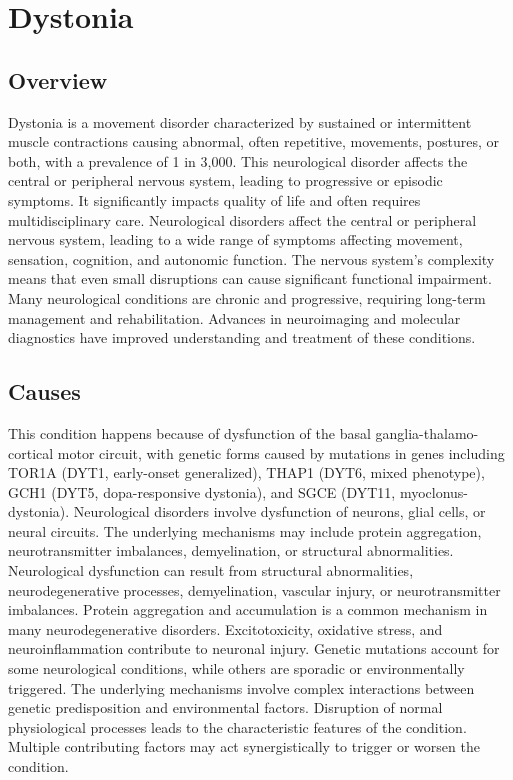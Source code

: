 \chapter{Dystonia}
\label{sec:Dystonia}

\section{Overview}
Dystonia is a movement disorder characterized by sustained or intermittent muscle contractions causing abnormal, often repetitive, movements, postures, or both, with a prevalence of 1 in 3,000. This neurological disorder affects the central or peripheral nervous system, leading to progressive or episodic symptoms. It significantly impacts quality of life and often requires multidisciplinary care. Neurological disorders affect the central or peripheral nervous system, leading to a wide range of symptoms affecting movement, sensation, cognition, and autonomic function. The nervous system's complexity means that even small disruptions can cause significant functional impairment. Many neurological conditions are chronic and progressive, requiring long-term management and rehabilitation. Advances in neuroimaging and molecular diagnostics have improved understanding and treatment of these conditions.
\section{Causes}
This condition happens because of dysfunction of the basal ganglia-thalamo-cortical motor circuit, with genetic forms caused by mutations in genes including TOR1A (DYT1, early-onset generalized), THAP1 (DYT6, mixed phenotype), GCH1 (DYT5, dopa-responsive dystonia), and SGCE (DYT11, myoclonus-dystonia). Neurological disorders involve dysfunction of neurons, glial cells, or neural circuits. The underlying mechanisms may include protein aggregation, neurotransmitter imbalances, demyelination, or structural abnormalities. Neurological dysfunction can result from structural abnormalities, neurodegenerative processes, demyelination, vascular injury, or neurotransmitter imbalances. Protein aggregation and accumulation is a common mechanism in many neurodegenerative disorders. Excitotoxicity, oxidative stress, and neuroinflammation contribute to neuronal injury. Genetic mutations account for some neurological conditions, while others are sporadic or environmentally triggered. The underlying mechanisms involve complex interactions between genetic predisposition and environmental factors. Disruption of normal physiological processes leads to the characteristic features of the condition. Multiple contributing factors may act synergistically to trigger or worsen the condition.

